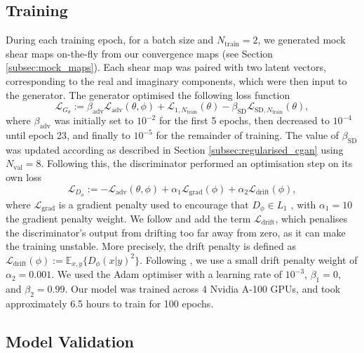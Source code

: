 \documentclass[fleqn,usenatbib]{mnras}
\newcommand{\Lagr}{\mathcal{L}}
\begin{document}
\subsection{Training}\label{subsec:training}

During each training epoch, for a batch size and $N_{\text{train}}=2$, we generated mock shear maps on-the-fly from our convergence maps (see Section \ref{subsec:mock_maps}). Each shear map was paired with two latent vectors, corresponding to the real and imaginary components, which were then input to the generator. The generator optimised the following loss function
\begin{equation}
	\Lagr_{G_{\theta}} := \beta_{\text{adv}}\Lagr_{\text{adv}}(\theta, \phi) + \Lagr_{1, N_{\text{train}}}(\theta) - \beta_{\text{SD}}\Lagr_{\text{SD}, N_{\text{train}}}(\theta),
\end{equation}
where $\beta_{\text{adv}}$ was initially set to $10^{-2}$ for the first 5 epochs, then decreased to $10^{-4}$ until epoch 23, and finally to $10^{-5}$ for the remainder of training. The value of $\beta_{\text{SD}}$ was updated according as described in Section \ref{subsec:regularised_cgan} using $N_{\text{val}}=8$. Following this, the discriminator performed an optimisation step on its own loss
\begin{equation}
	\Lagr_{D_{\phi}} := -\Lagr_{\text{adv}}(\theta, \phi) + \alpha_1 \Lagr_{\text{grad}}(\phi) + \alpha_2 \Lagr_{\text{drift}}(\phi),
\end{equation}
where $\Lagr_{\text{grad}}$ is a gradient penalty used to encourage that $D_{\phi} \in L_1$ \citep{gulrajani2017}, with $\alpha_1=10$ the gradient penalty weight. We follow \citet{karras2018progressive} and add the term $\Lagr_{\text{drift}}$, which penalises the discriminator's output from drifting too far away from zero, as it can make the training unstable. More precisely, the drift penalty is defined as $\Lagr_{\text{drift}}(\phi) := \mathbb{E}_{x,y}\{ D_{\phi}(x|y)^2 \}$. Following \citet{adler2018deep}, we use a small drift penalty weight of $\alpha_2=0.001$. We used the Adam optimiser \citep{kingma2014adam} with a learning rate of $10^{-3}$, $\beta_1=0$, and $\beta_2=0.99$. Our model was trained across 4 Nvidia A-100 GPUs, and took approximately 6.5 hours to train for 100 epochs.

\subsection{Model Validation}\label{sec:model_selection}
\end{document}
